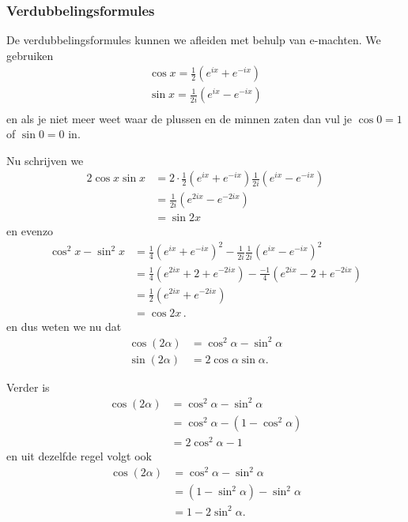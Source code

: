 \subsubsection{Verdubbelingsformules}

De verdubbelingsformules kunnen we afleiden met behulp van e-machten.
We gebruiken
\begin{align*}
	\cos x = \frac 1 2 \left( e^{ix} + e^{-ix} \right) \\
	\sin x = \frac 1 {2i} \left( e^{ix} - e^{-ix} \right) \\
\end{align*}
en als je niet meer weet waar de plussen en de minnen zaten dan vul je $\cos 0 = 1$ of $\sin 0 = 0$ in.

Nu schrijven we
\begin{align*}
	2 \cos x \sin x &= 2 \cdot \frac 1 2 \left( e^{i x} + e^{-ix} \right) \frac 1 {2i} \left( e^{ix} - e^{-ix} \right) \\
	&= \frac 1 {2i} \left(e^{2 i x} - e^{-2ix} \right) \\
	&= \sin 2 x
\end{align*}
en evenzo
\begin{align*}
	\cos^2 x - \sin^2 x &= \frac 1 4 \left( e^{ix} + e^{-ix} \right)^2  - \frac 1 {2i} \frac 1 {2i} \left( e^{ix} - e^{-ix} \right)^2 \\
	&= \frac 1 4 \left( e^{2ix} + 2 + e^{-2ix} \right) - \frac {-1} {4} \left( e^{2ix} - 2 + e^{-2ix} \right) \\
	&= \frac {1} {2} \left( e^{2ix} + e^{-2ix} \right) \\
	&= \cos 2x \,.
\end{align*}
en dus weten we nu dat
\begin{align} \label{verdubbeling1}
	\cos (2\alpha) &= \cos^2 \alpha - \sin^2 \alpha \\
	\sin (2\alpha) &= 2 \cos \alpha \sin \alpha. \label{verdubbeling2}
\end{align}


Verder is
\begin{align*}
	\cos (2 \alpha) &= \cos^2 \alpha - \sin^2 \alpha \\
	&= \cos^2 \alpha - (1 - \cos^2 \alpha ) \\
	&= 2  \cos^2 \alpha - 1
\end{align*}
en uit dezelfde regel volgt ook
\begin{align*}
	\cos (2 \alpha) &= \cos^2 \alpha - \sin^2 \alpha \\
	&= (1 - \sin^2 \alpha) - \sin^2 \alpha \\
	&= 1 - 2 \sin^2 \alpha .
\end{align*}

